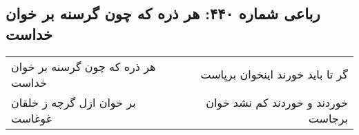 \begin{center}
\section*{رباعی شماره ۴۴۰: هر ذره که چون گرسنه بر خوان خداست}
\label{sec:0440}
\begin{longtable}{l p{0.5cm} r}
هر ذره که چون گرسنه بر خوان خداست
&&
گر تا باید خورند اینخوان برپاست
\\
بر خوان ازل گرچه ز خلقان غوغاست
&&
خوردند و خوردند کم نشد خوان برجاست
\\
\end{longtable}
\end{center}

